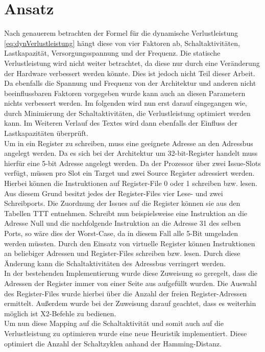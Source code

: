 \section{Ansatz}
Nach genauerem betrachten der Formel für die dynamische Verlustleistung \ref{eq:dynVerlustleistung} hängt diese von vier Faktoren ab, Schaltaktivitäten,  Lastkapazität, Versorgungsspannung und der Frequenz. Die statische Verlustleistung wird nicht weiter betrachtet, da diese nur durch eine Veränderung der Hardware verbessert werden könnte. Dies ist jedoch nicht Teil dieser Arbeit. Da ebenfalls die Spannung und Frequenz von der Architektur und anderen nicht beeinflussbaren Faktoren vorgegeben wurde kann auch an diesen Parametern nichts verbessert werden. Im folgenden wird nun erst darauf eingegangen wie, durch Minimierung der Schaltaktivitäten, die Verlustleistung optimiert werden kann. Im Weiteren Verlauf des Textes wird dann ebenfalls der Einfluss der Lastkapazitäten überprüft.\\
Um in ein Register zu schreiben, muss eine geeignete Adresse an den Adressbus angelegt werden. Da es sich bei der Architektur um 32-bit-Register handelt muss hierfür eine 5-bit Adresse angelegt werden.
Da der Prozessor über zwei Issue-Slots verfügt, müssen pro Slot ein Target und zwei Source Register adressiert werden. Hierbei können die Instruktionen auf Register-File 0 oder 1 schreiben bzw. lesen. Aus diesem Grund besitzt jedes der Register-Files vier Lese- und zwei Schreibports. Die Zuordnung der Issues auf die Register können sie aus den Tabellen TTT entnehmen. Schreibt nun beispielsweise eine Instruktion an die Adresse Null und die nachfolgende Instruktion an die Adresse 31 des selben Ports, so wäre dies der Worst-Case, da in diesem Fall alle 5-Bit umgeladen werden müssten.
Durch den Einsatz von virtuelle Register können Instruktionen an beliebiger Adressen und Register-Files schreiben bzw. lesen. Durch diese Änderung kann die Schaltaktivitäten des Adressbus verringert werden.\\
In der bestehenden Implementierung wurde diese Zuweisung so geregelt, dass die Adressen der Register immer von einer Seite aus aufgefüllt wurden. Die Auswahl des Register-Files wurde hierbei über die Anzahl der freien Register-Adressen ermittelt. Außerdem wurde bei der Zuweisung darauf geachtet, dass es weiterhin möglich ist X2-Befehle zu bedienen.\\
Um nun diese Mapping auf die Schaltaktivität und somit auch auf die Verlustleistung zu optimieren wurde eine neue Heuristik implementiert.
Diese optimiert die Anzahl der Schaltzyklen anhand der Hamming-Distanz.
